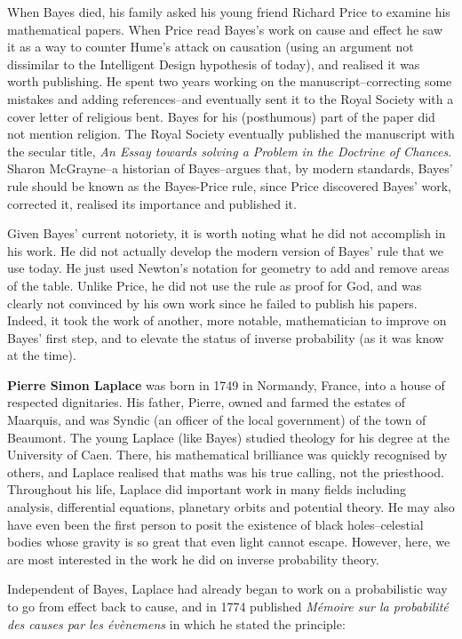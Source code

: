 \documentclass[a4paper,11pt]{apa7}
\begin{document}
When Bayes died, his family asked his young friend Richard Price to examine his mathematical papers. When Price read Bayes's work on cause and effect he saw it as a way to counter Hume's attack on causation (using an argument not dissimilar to the Intelligent Design hypothesis of today), and realised it was worth publishing. He spent two years working on the manuscript--correcting some mistakes and adding references--and eventually sent it to the Royal Society with a cover letter of religious bent. Bayes for his (posthumous) part of the paper did not mention religion. The Royal Society eventually published the manuscript with the secular title, \textit{An Essay towards solving a Problem in the Doctrine of Chances}. Sharon McGrayne--a historian of Bayes--argues that, by modern standards, Bayes' rule should be known as the Bayes-Price rule, since Price discovered Bayes' work, corrected it, realised its importance and published it.

Given Bayes' current notoriety, it is worth noting what he did not accomplish in his work. He did not actually develop the modern version of Bayes' rule that we use today. He just used Newton's notation for geometry to add and remove areas of the table. Unlike Price, he did not use the rule as proof for God, and was clearly not convinced by his own work since he failed to publish his papers. Indeed, it took the work of another, more notable, mathematician to improve on Bayes' first step, and to elevate the status of inverse probability (as it was know at the time).

\textbf{Pierre Simon Laplace} was born in 1749 in Normandy, France, into a house of respected dignitaries. His father, Pierre, owned and farmed the estates of Maarquis, and was Syndic (an officer of the local government) of the town of Beaumont. The young Laplace (like Bayes) studied theology for his degree at the University of Caen. There, his mathematical brilliance was quickly recognised by others, and Laplace realised that maths was his true calling, not the priesthood. Throughout his life, Laplace did important work in many fields including analysis, differential equations, planetary orbits and potential theory. He may also have even been the first person to posit the existence of black holes--celestial bodies whose gravity is so great that even light cannot escape. However, here, we are most interested in the work he did on inverse probability theory.

Independent of Bayes, Laplace had already began to work on a probabilistic way to go from effect back to cause, and in 1774 published \textit{M{\'e}moire sur la probabilit{\'e} des causes par les {\'e}v{\`e}nemens} in which he stated the principle:
\end{document}
